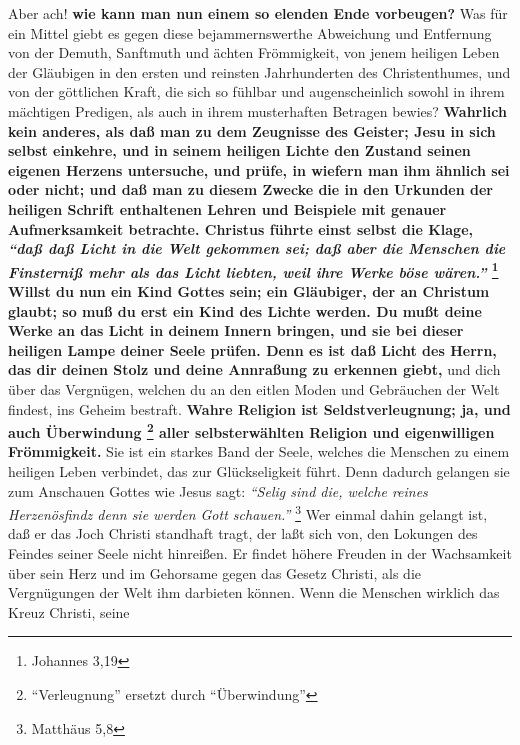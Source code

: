 Aber ach! \textbf{wie kann man nun einem so elenden Ende vorbeugen?} Was für ein
Mittel
giebt es gegen diese bejammernswerthe Abweichung und Entfernung von der Demuth,
Sanftmuth und ächten Frömmigkeit, von jenem heiligen Leben der Gläubigen in den
ersten und reinsten Jahrhunderten des Christenthumes, und von der göttlichen
Kraft, die sich so fühlbar und augenscheinlich sowohl in ihrem mächtigen
Predigen, als auch in ihrem musterhaften Betragen bewies? \textbf{Wahrlich kein
anderes,
als daß man zu dem Zeugnisse des Geister; Jesu in sich
selbst einkehre, und in
seinem heiligen Lichte den Zustand seinen eigenen Herzens untersuche, und prüfe,
in wiefern man ihm ähnlich sei oder nicht; und daß man zu diesem Zwecke die in
den Urkunden der heiligen Schrift enthaltenen Lehren und
Beispiele mit genauer
Aufmerksamkeit betrachte. Christus führte einst selbst die Klage,
\textit{"`daß daß
Licht in die Welt gekommen sei; daß aber die Menschen die Finsterniß mehr als
das Licht liebten, weil ihre Werke böse wären."'}
\footnote{Johannes 3,19}
Willst du
nun ein Kind Gottes sein; ein Gläubiger, der an Christum
glaubt; so muß du erst
ein Kind des Lichte werden. Du mußt deine Werke an das
Licht in deinem Innern
bringen, und sie bei dieser heiligen Lampe deiner Seele prüfen. Denn es ist daß
Licht des Herrn, das dir deinen Stolz und deine Annraßung zu erkennen giebt,}
und
dich über das Vergnügen, welchen du an den eitlen Moden und
Gebräuchen der Welt
findest, ins Geheim bestraft. \textbf{Wahre Religion ist Seldstverleugnung; ja,
und auch
Überwindung \footnote{"`Verleugnung"' ersetzt durch "`Überwindung"'} aller selbsterwählten Religion und eigenwilligen Frömmigkeit.} Sie
ist ein starkes Band der Seele, welches die Menschen zu einem heiligen Leben
verbindet, das zur Glückseligkeit führt. Denn dadurch gelangen sie zum Anschauen
Gottes wie Jesus sagt:
\textit{"`Selig sind die, welche reines Herzenösfindz denn sie
werden Gott schauen."'}
\footnote{Matthäus 5,8}
Wer einmal dahin gelangt ist, daß
er das Joch Christi standhaft tragt, der laßt sich von, den Lokungen des Feindes
seiner Seele nicht hinreißen. Er findet höhere Freuden in der Wachsamkeit über
sein Herz und im Gehorsame gegen das Gesetz Christi, als die Vergnügungen der
Welt ihm darbieten können. Wenn die Menschen wirklich das Kreuz Christi, seine

